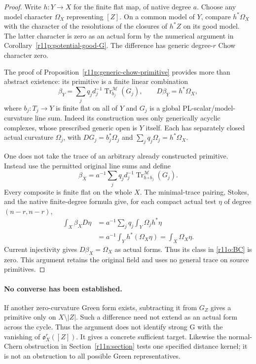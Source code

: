 \begin{proof}
Write $h:Y\to X$ for the finite flat map, of native degree $a$.
Choose any model character $\Omega_X$ representing $[Z]$.
On a common model of $Y$, compare $h^*\Omega_X$ with the
character of the resolutions of the closures of $h^*Z$ on its
good model.  The latter character is zero as an actual form by
the numerical argument in Corollary~\ref{r11p:potential-good-G}.
The difference has generic degree-$r$ Chow character zero.

The proof of Proposition~\ref{r11p:generic-chow-primitive}
provides more than abstract existence: its primitive is a finite
linear combination
\[
 \beta_Y=\sum_j q_jd_j^{-1}
             \operatorname{Tr}^{\mathscr M}_{b_j}(G_j),
          \qquad D\beta_Y=h^*\Omega_X,
\]
where $b_j:T_j\to Y$ is finite flat on all of $Y$ and $G_j$ is
a global PL-scalar/model-curvature line sum.  Indeed its construction
uses only generically acyclic complexes, whose prescribed generic
open is $Y$ itself.  Each has separately closed actual curvature
$\Omega_j$, with $DG_j=b_j^*\Omega_j$ and
$\sum_jq_j\Omega_j=h^*\Omega_X$.

One does not take the trace of an arbitrary already constructed
primitive.  Instead use the permitted original line sums and define
\[
 \beta_X=a^{-1}\sum_jq_jd_j^{-1}
                    \operatorname{Tr}^{\mathscr M}_{h\circ b_j}(G_j).
\]
Every composite is finite flat on the whole $X$.  The minimal-trace
pairing, Stokes, and the native finite-degree formula give, for
each compact actual test $\eta$ of degree $(n-r,n-r)$,
\[
 \begin{split}
 \int_X\beta_XD\eta
 &=a^{-1}\sum_jq_j\int_Y\Omega_jh^*\eta\\
 &=a^{-1}\int_Yh^*(\Omega_X\eta)
 =\int_X\Omega_X\eta.
 \end{split}
\]
Current injectivity gives $D\beta_X=\Omega_X$ as actual forms.
Thus its class in \eqref{r11o:BC} is zero.  This argument retains
the original field and uses no general trace on source primitives.
\end{proof}

\paragraph{No converse has been established.}
If another zero-curvature Green form exists, subtracting it from
$G_Z$ gives a primitive only on $X\setminus|Z|$.  Such a difference
need not extend as an actual form across the cycle.  Thus the argument
does not identify strong G with the vanishing of
$\mathfrak o_X^r([Z])$.  It gives a concrete sufficient target.
Likewise the normal-Chern obstruction in Section~\ref{r11n:section}
tests one specified distance kernel; it is not an obstruction to all
possible Green representatives.


